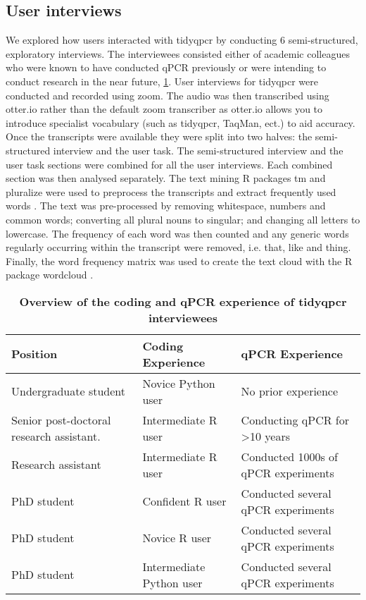 \documentclass[../main.tex]{subfiles}
\begin{document}
\subsection{User interviews}
We explored how users interacted with tidyqpcr by conducting 6 semi-structured, exploratory interviews. 
The interviewees consisted either of academic colleagues who were known to have conducted qPCR previously or were intending to conduct research in the near future, \ref{tab:interviewee-table}.
User interviews for tidyqpcr were conducted and recorded using zoom.
The audio was then transcribed using otter.io rather than the default zoom transcriber as otter.io allows you to introduce specialist vocabulary (such as tidyqpcr, TaqMan, ect.) to aid accuracy.
Once the transcripts were available they were split into two halves: the semi-structured interview and the user task.
The semi-structured interview and the user task sections were combined for all the user interviews.
Each combined section was then analysed separately. 
The text mining R packages tm and pluralize were used to preprocess the transcripts and extract frequently used words \parencite{Feinerer2008, Rudis2020}.
The text was pre-processed by removing whitespace, numbers and common words; converting all plural nouns to singular; and changing all letters to lowercase.
The frequency of each word was then counted and any generic words regularly occurring within the transcript were removed, i.e. that, like and thing.
Finally, the word frequency matrix was used to create the text cloud with the R package wordcloud \parencite{Fellows2018}.

\begin{table}
\centering
\begingroup
\setlength{\tabcolsep}{5pt}
\def\arraystretch{1.25}
\begin{tabular}{|| m{4cm} | m{4.3cm} | m{4cm} ||}
 \hline
 \textbf{\large Position} & \textbf{\large Coding Experience} & \textbf{\large qPCR Experience} \\ [0.5ex] 
 \hline
 Undergraduate student & Novice Python user & No prior experience\\ 
 \hline
 Senior post-doctoral research assistant. & Intermediate R user & Conducting qPCR for >10 years \\
 \hline
 Research assistant & Intermediate R user & Conducted 1000s of qPCR experiments\\
 \hline
 PhD student & Confident R user & Conducted several qPCR experiments \\
 \hline
 PhD student & Novice R user & Conducted several qPCR experiments\\
 \hline
 PhD student & Intermediate Python user & Conducted several qPCR experiments\\
 \hline
\end{tabular}
 \endgroup
 \caption[Overview of the coding and qPCR experience of tidyqpcr interviewees]{\textbf{Overview of the coding and qPCR experience of tidyqpcr interviewees}}
 \label{tab:interviewee-table}
\end{table}
\end{document}
